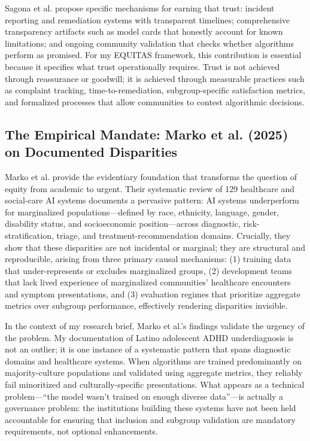 \documentclass[12pt,letterpaper]{article}
\begin{document}
Sagona et al. propose specific mechanisms for earning that trust: incident reporting and remediation systems with transparent timelines; comprehensive transparency artifacts such as model cards that honestly account for known limitations; and ongoing community validation that checks whether algorithms perform as promised.\cite{sagona2025} For my EQUITAS framework, this contribution is essential because it specifies what trust operationally requires. Trust is not achieved through reassurance or goodwill; it is achieved through measurable practices such as complaint tracking, time-to-remediation, subgroup-specific satisfaction metrics, and formalized processes that allow communities to contest algorithmic decisions.\cite{sagona2025}

\subsection{The Empirical Mandate: Marko et al. (2025) on Documented Disparities}

Marko et al. provide the evidentiary foundation that transforms the question of equity from academic to urgent. Their systematic review of 129 healthcare and social-care AI systems documents a pervasive pattern: AI systems underperform for marginalized populations---defined by race, ethnicity, language, gender, disability status, and socioeconomic position---across diagnostic, risk-stratification, triage, and treatment-recommendation domains.\cite{marko2025} Crucially, they show that these disparities are not incidental or marginal; they are structural and reproducible, arising from three primary causal mechanisms: (1) training data that under-represents or excludes marginalized groups, (2) development teams that lack lived experience of marginalized communities' healthcare encounters and symptom presentations, and (3) evaluation regimes that prioritize aggregate metrics over subgroup performance, effectively rendering disparities invisible.\cite{marko2025}

In the context of my research brief, Marko et al.'s findings validate the urgency of the problem. My documentation of Latino adolescent ADHD underdiagnosis is not an outlier; it is one instance of a systematic pattern that spans diagnostic domains and healthcare systems.\cite{marko2025} When algorithms are trained predominantly on majority-culture populations and validated using aggregate metrics, they reliably fail minoritized and culturally-specific presentations. What appears as a technical problem---``the model wasn't trained on enough diverse data''---is actually a governance problem: the institutions building these systems have not been held accountable for ensuring that inclusion and subgroup validation are mandatory requirements, not optional enhancements.\cite{marko2025}
\end{document}
